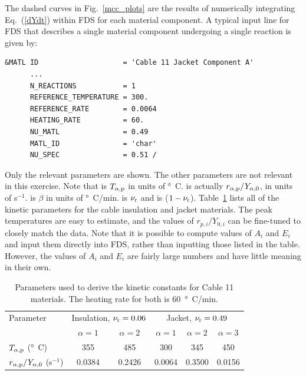 \documentclass[11pt]{book}
\begin{document}
The dashed curves in Fig.~\ref{mcc_plots} are the results of numerically integrating Eq.~(\ref{dYdt}) within FDS for each material component. A typical input line for FDS that describes a single material component undergoing a single reaction is given by:
\begin{lstlisting}
&MATL ID                    = 'Cable 11 Jacket Component A'
      ...
      N_REACTIONS           = 1
      REFERENCE_TEMPERATURE = 300.
      REFERENCE_RATE        = 0.0064
      HEATING_RATE          = 60.
      NU_MATL               = 0.49
      MATL_ID               = 'char'
      NU_SPEC               = 0.51 /
\end{lstlisting}
Only the relevant parameters are shown. The other parameters are not relevant in this exercise. Note that  is $T_{\alpha,{\rm p}}$ in units of \si{\degree C}.  is actually $r_{\alpha,{\rm p}}/Y_{\alpha,0}$, in units of s$^{-1}$.  is $\beta$ in units of \si{\degree C}/min.  is $\nu_{\rm r}$ and  is ($1-\nu_{\rm r}$). Table~\ref{cable_parameters} lists all of the kinetic parameters for the cable insulation and jacket materials. The peak temperatures are easy to estimate, and the values of $r_{p,i}/Y_{0,i}$ can be fine-tuned to closely match the data. Note that it is possible to compute values of $A_i$ and $E_i$ and input them directly into FDS, rather than inputting those listed in the table. However, the values of $A_i$ and $E_i$ are fairly large numbers and have little meaning in their own.

\begin{table}[!htb]
\centering
\caption[Parameters for kinetic constants for cable materials]{Parameters used to derive the kinetic constants for Cable 11 materials. The heating rate for both is 60~\si{\degree C}/min.}
\label{cable_parameters}
\begin{tabular}{|l||c|c||c|c|c|}
\hline
Parameter                                       & \multicolumn{2}{|c||}{Insulation, $\nu_{\rm r}=0.06$ } &  \multicolumn{3}{|c|}{Jacket, $\nu_{\rm r}=0.49$}     \\ \cline{2-6}
                                                & $\alpha=1$    & $\alpha=2$                             &  $\alpha=1$  & $\alpha=2$   & $\alpha=3$              \\ \hline \hline
$T_{\alpha,{\rm p}}$ (\si{\degree C})           & 355           & 485                                    &  300         & 345          & 450                     \\ \hline
$r_{\alpha,{\rm p}}/Y_{\alpha,0}$ (s$^{-1}$)    & 0.0384        & 0.2426                                 &  0.0064      & 0.3500       & 0.0156                  \\ \hline
\end{tabular}
\end{table}
\end{document}
